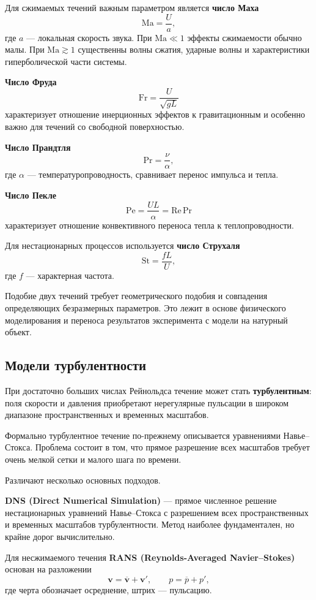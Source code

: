 Для сжимаемых течений важным параметром является \textbf{число Маха}
\[
\mathrm{Ma}=\frac{U}{a},
\]
где $a$ --- локальная скорость звука. При $\mathrm{Ma}\ll 1$ эффекты сжимаемости обычно малы. При $\mathrm{Ma}\gtrsim 1$ существенны волны сжатия, ударные волны и характеристики гиперболической части системы.

\textbf{Число Фруда}
\[
\mathrm{Fr}
=
\frac{U}{\sqrt{gL}}
\]
характеризует отношение инерционных эффектов к гравитационным и особенно важно для течений со свободной поверхностью.

\textbf{Число Прандтля}
\[
\mathrm{Pr}
=
\frac{\nu}{\alpha},
\]
где $\alpha$ --- температуропроводность, сравнивает перенос импульса и тепла.

\textbf{Число Пекле}
\[
\mathrm{Pe}
=
\frac{UL}{\alpha}
=
\mathrm{Re}\,\mathrm{Pr}
\]
характеризует отношение конвективного переноса тепла к теплопроводности.

Для нестационарных процессов используется \textbf{число Струхаля}
\[
\mathrm{St}
=
\frac{fL}{U},
\]
где $f$ --- характерная частота.

Подобие двух течений требует геометрического подобия и совпадения определяющих безразмерных параметров. Это лежит в основе физического моделирования и переноса результатов эксперимента с модели на натурный объект.

\subsection{Модели турбулентности}

При достаточно больших числах Рейнольдса течение может стать \textbf{турбулентным}: поля скорости и давления приобретают нерегулярные пульсации в широком диапазоне пространственных и временных масштабов.

Формально турбулентное течение по-прежнему описывается уравнениями Навье--Стокса. Проблема состоит в том, что прямое разрешение всех масштабов требует очень мелкой сетки и малого шага по времени.

Различают несколько основных подходов.

\textbf{DNS (Direct Numerical Simulation)} --- прямое численное решение нестационарных уравнений Навье--Стокса с разрешением всех пространственных и временных масштабов турбулентности. Метод наиболее фундаментален, но крайне дорог вычислительно.

Для несжимаемого течения \textbf{RANS (Reynolds-Averaged Navier--Stokes)} основан на разложении
\[
\mathbf{v}
=
\overline{\mathbf{v}}
+
\mathbf{v}',
\qquad
p
=
\overline{p}
+
p',
\]
где черта обозначает осреднение, штрих --- пульсацию.

